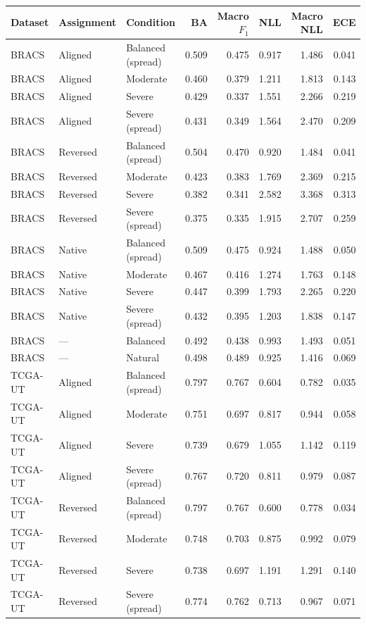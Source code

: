\begin{tabular}{lllrrrrr}
\toprule
Dataset & Assignment & Condition & BA & Macro $F_1$ & NLL & Macro NLL & ECE \\
\midrule
BRACS & Aligned & Balanced (spread) & 0.509 & 0.475 & 0.917 & 1.486 & 0.041 \\
BRACS & Aligned & Moderate & 0.460 & 0.379 & 1.211 & 1.813 & 0.143 \\
BRACS & Aligned & Severe & 0.429 & 0.337 & 1.551 & 2.266 & 0.219 \\
BRACS & Aligned & Severe (spread) & 0.431 & 0.349 & 1.564 & 2.470 & 0.209 \\
BRACS & Reversed & Balanced (spread) & 0.504 & 0.470 & 0.920 & 1.484 & 0.041 \\
BRACS & Reversed & Moderate & 0.423 & 0.383 & 1.769 & 2.369 & 0.215 \\
BRACS & Reversed & Severe & 0.382 & 0.341 & 2.582 & 3.368 & 0.313 \\
BRACS & Reversed & Severe (spread) & 0.375 & 0.335 & 1.915 & 2.707 & 0.259 \\
BRACS & Native & Balanced (spread) & 0.509 & 0.475 & 0.924 & 1.488 & 0.050 \\
BRACS & Native & Moderate & 0.467 & 0.416 & 1.274 & 1.763 & 0.148 \\
BRACS & Native & Severe & 0.447 & 0.399 & 1.793 & 2.265 & 0.220 \\
BRACS & Native & Severe (spread) & 0.432 & 0.395 & 1.203 & 1.838 & 0.147 \\
BRACS & --- & Balanced & 0.492 & 0.438 & 0.993 & 1.493 & 0.051 \\
BRACS & --- & Natural & 0.498 & 0.489 & 0.925 & 1.416 & 0.069 \\
TCGA-UT & Aligned & Balanced (spread) & 0.797 & 0.767 & 0.604 & 0.782 & 0.035 \\
TCGA-UT & Aligned & Moderate & 0.751 & 0.697 & 0.817 & 0.944 & 0.058 \\
TCGA-UT & Aligned & Severe & 0.739 & 0.679 & 1.055 & 1.142 & 0.119 \\
TCGA-UT & Aligned & Severe (spread) & 0.767 & 0.720 & 0.811 & 0.979 & 0.087 \\
TCGA-UT & Reversed & Balanced (spread) & 0.797 & 0.767 & 0.600 & 0.778 & 0.034 \\
TCGA-UT & Reversed & Moderate & 0.748 & 0.703 & 0.875 & 0.992 & 0.079 \\
TCGA-UT & Reversed & Severe & 0.738 & 0.697 & 1.191 & 1.291 & 0.140 \\
TCGA-UT & Reversed & Severe (spread) & 0.774 & 0.762 & 0.713 & 0.967 & 0.071 \\

\end{tabular}
